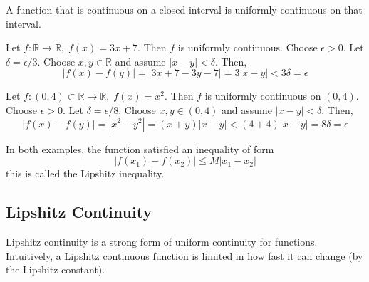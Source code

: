   \begin{theorem}
  A function that is continuous on a closed interval is uniformly continuous on that interval. 
  \end{theorem}


  \begin{example}
    Let $f: \mathbb{R} \longrightarrow \mathbb{R}, \; f(x) = 3x+7$. Then $f$ is uniformly continuous. Choose $\epsilon > 0$. Let $\delta = \epsilon / 3$. Choose $x, y \in \mathbb{R}$ and assume $|x-y| < \delta$. Then, 
    \[ | f(x) - f(y) | = | 3x + 7 - 3 y - 7 | = 3 |x-y| < 3 \delta = \epsilon\]
  \end{example}

  \begin{example}
    Let $f: (0, 4) \subset \mathbb{R} \longrightarrow \mathbb{R}, \; f(x) = x^2$. Then $f$ is uniformly continuous on $(0, 4)$. Choose $\epsilon > 0$. Let $\delta = \epsilon / 8$. Choose $x, y \in (0, 4)$ and assume $|x-y| < \delta$. Then, 
    \[ |f(x) - f(y)| = |x^2 - y^2| = (x+y) |x-y| < (4+4) |x-y| = 8\delta = \epsilon\]
  \end{example}

  In both examples, the function satisfied an inequality of form 
  \[ |f(x_1) - f(x_2)| \leq M |x_1 - x_2|\]
  this is called the Lipshitz inequality. 

\subsection{Lipshitz Continuity}

  Lipshitz continuity is a strong form of uniform continuity for functions. Intuitively, a Lipshitz continuous function is limited in how fast it can change (by the Lipshitz constant). 

